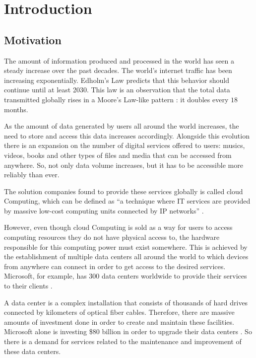 \chapter{Introduction}\label{chap:introduction}

\section{Motivation}\label{sec:motivation}

The amount of information produced and processed in the world has seen a steady increase over the past decades.
The world's internet traffic has been increasing exponentially.
Edholm's Law \cite{Edholm04} predicts that this behavior should continue until at least 2030.
This law is an observation that the total data transmitted globally rises in a Moore's Law-like pattern \cite{Moore98}: it doubles every $18$ months.

As the amount of data generated by users all around the world increases, the need to store and access this data increases accordingly.
Alongside this evolution there is an expansion on the number of digital services offered to users: musics, videos, books and other types of files and media that can be accessed from anywhere.
So, not only data volume increases, but it has to be accessible more reliably than ever.

The solution companies found to provide these services globally is called cloud Computing, which can be defined as ``a technique where IT services are provided by massive low-cost computing units connected by IP networks'' \cite{Qian09}.

However, even though cloud Computing is sold as a way for users to access computing resources they do not have physical access to, the hardware responsible for this computing power must exist somewhere.
This is achieved by the establishment of multiple data centers all around the world to which devices from anywhere can connect in order to get access to the desired services.
Microsoft, for example, has 300 data centers worldwide to provide their services to their clients \cite{MicrosoftDataCenters}.

A data center is a complex installation that consists of thousands of hard drives connected by kilometers of optical fiber cables.
Therefore, there are massive amounts of investment done in order to create and maintain these facilities.
Microsoft alone is investing \$80 billion in order to upgrade their data centers \cite{MicrosoftDataCenters}.
So there is a demand for services related to the maintenance and improvement of these data centers.

